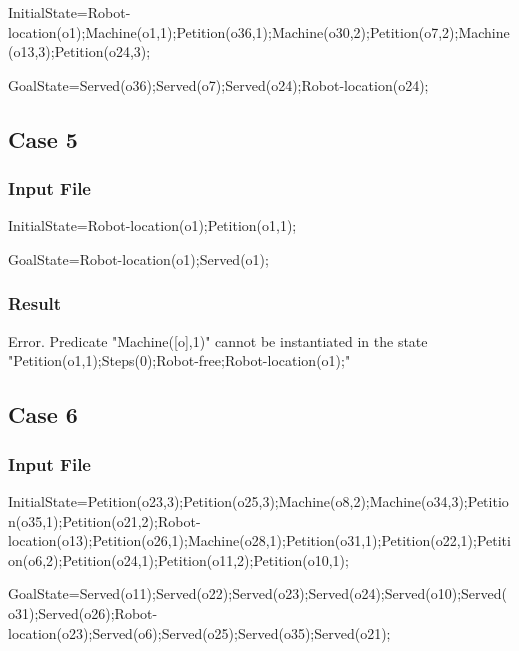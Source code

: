 \documentclass[12pt,a4paper,oneside]{article}
\numberwithin{equation}{section}
\numberwithin{equation}{section}
\theoremstyle{definition}
\begin{document}
\begin{listing}[style=consola, numbers=none]
InitialState=Robot-location(o1);Machine(o1,1);Petition(o36,1);Machine(o30,2);Petition(o7,2);Machine(o13,3);Petition(o24,3);

GoalState=Served(o36);Served(o7);Served(o24);Robot-location(o24);
\end{listing}

 


\subsection*{Case 5}

\subsubsection*{Input File}

\begin{listing}[style=consola, numbers=none]
InitialState=Robot-location(o1);Petition(o1,1);


GoalState=Robot-location(o1);Served(o1);
\end{listing}

\subsubsection*{Result}

\begin{listing}[style=consola, numbers=none]
Error. Predicate "Machine([o],1)" cannot be instantiated in the state "Petition(o1,1);Steps(0);Robot-free;Robot-location(o1);"
\end{listing}


\subsection*{Case 6}

\subsubsection*{Input File}

\begin{listing}[style=consola, numbers=none]
InitialState=Petition(o23,3);Petition(o25,3);Machine(o8,2);Machine(o34,3);Petition(o35,1);Petition(o21,2);Robot-location(o13);Petition(o26,1);Machine(o28,1);Petition(o31,1);Petition(o22,1);Petition(o6,2);Petition(o24,1);Petition(o11,2);Petition(o10,1);

GoalState=Served(o11);Served(o22);Served(o23);Served(o24);Served(o10);Served(o31);Served(o26);Robot-location(o23);Served(o6);Served(o25);Served(o35);Served(o21);
\end{listing}

 



\end{document}

